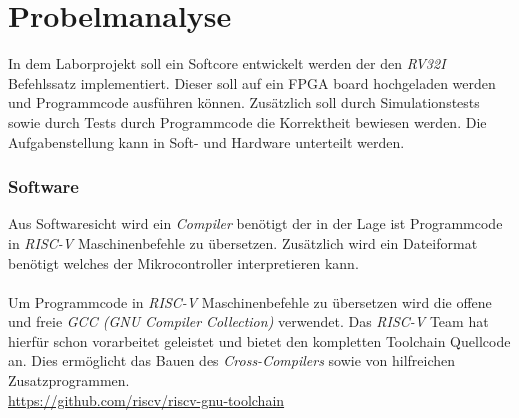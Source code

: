 \chapter{Probelmanalyse}

    In dem Laborprojekt soll ein Softcore entwickelt werden der den \textit{RV32I} Befehlssatz implementiert.
    Dieser soll auf ein FPGA board hochgeladen werden und Programmcode ausführen können.
    Zusätzlich soll durch Simulationstests sowie durch Tests durch Programmcode die Korrektheit
    bewiesen werden.
    Die Aufgabenstellung kann in Soft- und Hardware unterteilt werden.

        \subsection{Software}
            Aus Softwaresicht wird ein \textit{Compiler} benötigt der in der Lage ist Programmcode
            in \textit{RISC-V} Maschinenbefehle zu übersetzen. Zusätzlich wird ein Dateiformat benötigt
            welches der Mikrocontroller interpretieren kann.
            \\\\
            Um Programmcode in \textit{RISC-V} Maschinenbefehle zu übersetzen wird die 
            offene und freie \textit{GCC (GNU Compiler Collection)} verwendet.
            Das \textit{RISC-V} Team hat hierfür schon vorarbeitet geleistet und bietet
            den kompletten Toolchain Quellcode an.
            Dies ermöglicht das Bauen des \textit{Cross-Compilers} sowie von hilfreichen Zusatzprogrammen.
            \\
            \url{https://github.com/riscv/riscv-gnu-toolchain}

